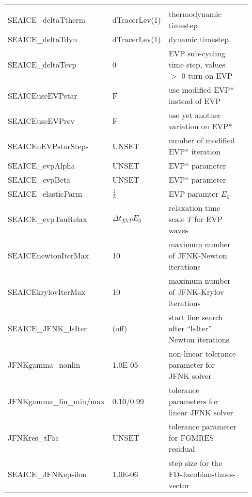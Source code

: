 \begin{table}[!ht]
{\begin{tabular}{|llp{5cm}c|}
    &  %
    \\
   SEAICE\_deltaTtherm  &                   dTracerLev(1)
    &   thermodynamic timestep 
    &  %
    \\
   SEAICE\_deltaTdyn    &                   dTracerLev(1)
    &   dynamic timestep 
    &  %
    \\
   SEAICE\_deltaTevp    &                   0
    &   EVP sub-cycling time step, values $>$ 0 turn on EVP
    &  
    \\
   SEAICEuseEVPstar    & F & use modified EVP* instead of EVP & %
    \\
   SEAICEuseEVPrev     & F & use yet another variation on EVP* & %
    \\
   SEAICEnEVPstarSteps & UNSET & number of modified EVP* iteration & %
    \\
   SEAICE\_evpAlpha & UNSET & EVP* parameter & %
    \\
   SEAICE\_evpBeta & UNSET & EVP* parameter & %
    \\
   SEAICE\_elasticParm & $\frac{1}{3}$ 
     & EVP paramter $E_0$ & \\
   SEAICE\_evpTauRelax & $\Delta{t}_{EVP}E_0$ 
     & relaxation time scale $T$ for EVP waves & \\
    SEAICEnewtonIterMax & 10
    & maximum number of JFNK-Newton iterations
    &  %
    \\
    SEAICEkrylovIterMax & 10
    & maximum number of JFNK-Krylov iterations
    &  %
    \\
    SEAICE\_JFNK\_lsIter & (off)
    & start line search after ``lsIter'' Newton iterations
    &  %
    \\
    JFNKgamma\_nonlin        & 1.0E-05
    & non-linear tolerance parameter for JFNK solver
    &  %
    \\
    JFNKgamma\_lin\_min/max  & 0.10/0.99
    & tolerance parameters for linear JFNK solver
    &  %
    \\
    JFNKres\_tFac            & UNSET
    & tolerance parameter for FGMRES residual
    &  %
    \\
    SEAICE\_JFNKepsilon      & 1.0E-06
    & step size for the FD-Jacobian-times-vector 

\end{tabular}}
\end{table}
